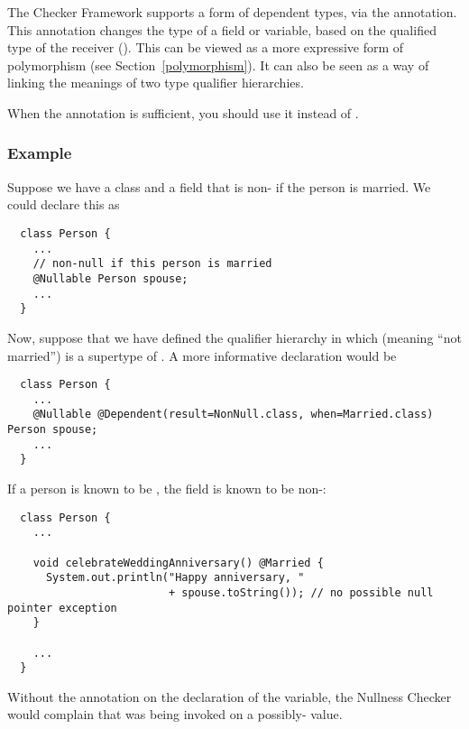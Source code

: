 The Checker Framework supports a form of dependent types, via the
 annotation.
This annotation changes the type of a field or variable, based on the
qualified type of the receiver ().  This can be viewed as a more
expressive form of polymorphism (see Section~\ref{polymorphism}).  It can
also be seen as a way of linking the meanings of two type qualifier
hierarchies.

When the  annotation is sufficient, you
should use it instead of .


\subsubsection{Example\label{dependent-types-example}}

Suppose we have a class  and a field  that is
non- if the person is married.  We could declare this as

\begin{Verbatim}
  class Person {
    ...
    // non-null if this person is married
    @Nullable Person spouse;
    ...
  }
\end{Verbatim}

Now, suppose that we have defined the qualifier hierarchy in which 
 (meaning ``not married'') is a supertype of .
A more informative declaration would be

\begin{Verbatim}
  class Person {
    ...
    @Nullable @Dependent(result=NonNull.class, when=Married.class) Person spouse;
    ...
  }
\end{Verbatim}

If a person is known to be , the
 field is known to be non-:

\begin{Verbatim}
  class Person {
    ...

    void celebrateWeddingAnniversary() @Married {
      System.out.println("Happy anniversary, "
                         + spouse.toString()); // no possible null pointer exception
    }

    ...
  }
\end{Verbatim}

Without the  annotation on the
declaration of the  variable, the Nullness Checker would
complain that  was being invoked on a possibly-
value.

